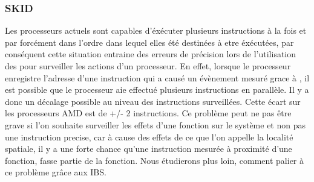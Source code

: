 					\subsubsection{SKID}
						Les processeurs actuels sont capables d'éxécuter plusieurs instructions à la fois et par forcément dans l'ordre dans lequel elles été destinées à etre éxécutées, par conséquent cette situation entraine des erreurs de précision lors de l'utilisation des \PMC pour surveiller les actions d'un processeur. En effet, lorsque le processeur enregistre l'adresse d'une instruction qui a causé un évènement mesuré grace à \PMC, il est possible que le processeur aie effectué plusieurs instructions en parallèle. Il y a donc un décalage possible au niveau des instructions surveillées. Cette écart sur les processeurs AMD est de +/- 2 instructions. Ce problème peut ne pas être grave si l'on souhaite surveiller les effets d'une fonction sur le système et non pas une instruction precise, car à cause des effets de ce que l'on appelle la localité spatiale, il y a une forte chance qu'une instruction mesurée à proximité d'une fonction, fasse partie de la fonction. Nous étudierons plus loin, comment palier à ce problème grâce aux IBS.
